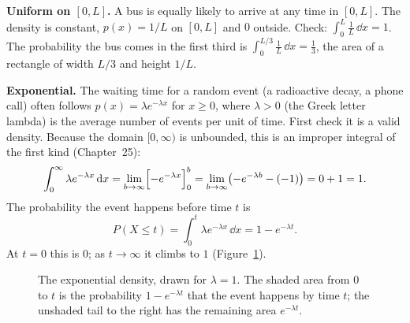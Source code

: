 \begin{example}
\label{ch26:ex-density}
\textbf{Uniform on $[0,L]$.} A bus is equally likely to arrive at any time in
$[0,L]$. The density is constant, $p(x) = 1/L$ on $[0,L]$ and $0$ outside. Check:
$\int_0^L \tfrac1L\,\dd x = 1$. The probability the bus comes in the first third is
$\int_0^{L/3}\tfrac1L\,\dd x = \tfrac13$, the area of a rectangle of width $L/3$
and height $1/L$.

\textbf{Exponential.} The waiting time for a random event (a radioactive decay, a
phone call) often follows $p(x) = \lambda e^{-\lambda x}$ for $x\ge 0$, where
$\lambda > 0$ (the Greek letter lambda) is the average number of events per unit of
time. First check it is a valid density. Because the domain $[0,\infty)$ is unbounded, this is an
improper integral of the first kind (Chapter~25):
\[
  \int_0^{\infty}\lambda e^{-\lambda x}\,\mathrm{d} x
  = \lim_{b\to\infty}\Bigl[-e^{-\lambda x}\Bigr]_0^{b}
  = \lim_{b\to\infty}\bigl(-e^{-\lambda b} - (-1)\bigr)
  = 0 + 1 = 1.
\]
The probability the event happens before time $t$ is
\[
  P(X \le t) = \int_0^t \lambda e^{-\lambda x}\,\dd x
             = 1 - e^{-\lambda t}.
\]
At $t=0$ this is $0$; as $t\to\infty$ it climbs to $1$
(Figure~\ref{ch26:fig-exp-density}).
\end{example}

\begin{figure}[htbp]
\centering
{}
\caption{The exponential density, drawn for $\lambda=1$. The shaded area from $0$ to $t$
is the probability $1-e^{-\lambda t}$ that the event happens by time $t$; the unshaded
tail to the right has the remaining area $e^{-\lambda t}$.}
\label{ch26:fig-exp-density}
\end{figure}


